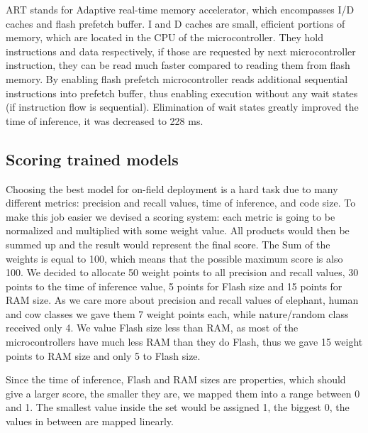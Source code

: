 ART stands for Adaptive real-time memory accelerator, which encompasses I/D caches and flash prefetch buffer.
I and D caches are small, efficient portions of memory, which are located in the CPU of the microcontroller.
They hold instructions and data respectively, if those are requested by next microcontroller instruction, they can be read much faster compared to reading them from flash memory. 
By enabling flash prefetch microcontroller reads additional sequential instructions into prefetch buffer, thus enabling execution without any wait states (if instruction flow is sequential).
Elimination of wait states greatly improved the time of inference, it was decreased to 228 \si{\milli\second}.


\subsection{ Scoring trained models}\label{scoring_models}

Choosing the best model for on-field deployment is a hard task due to many different metrics: precision and recall values, time of inference, and code size.
To make this job easier we devised a scoring system: each metric is going to be normalized and multiplied with some weight value.
All products would then be summed up and the result would represent the final score.
The Sum of the weights is equal to 100, which means that the possible maximum score is also 100.
We decided to allocate 50 weight points to all precision and recall values, 30 points to the time of inference value, 5 points for Flash size and 15 points for RAM size.
As we care more about precision and recall values of elephant, human and cow classes we gave them 7 weight points each, while nature/random class received only 4.
We value Flash size less than RAM, as most of the microcontrollers have much less RAM than they do Flash, thus we gave 15 weight points to RAM size and only 5 to Flash size.

Since the time of inference, Flash and RAM sizes are properties, which should give a larger score, the smaller they are, we mapped them into a range between 0 and 1.
The smallest value inside the set would be assigned 1, the biggest 0, the values in between are mapped linearly.

